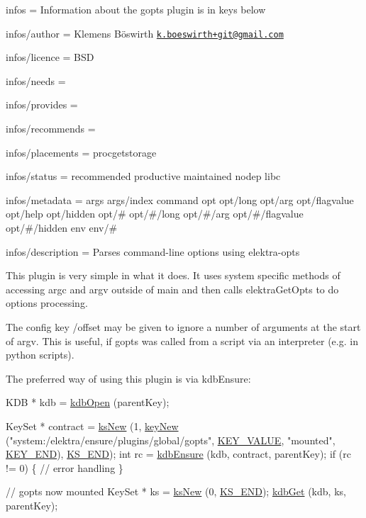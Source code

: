 
\begin{DoxyItemize}
\item infos = Information about the gopts plugin is in keys below
\item infos/author = Klemens Böswirth \href{mailto:k.boeswirth+git@gmail.com}{\tt k.\+boeswirth+git@gmail.\+com}
\item infos/licence = B\+SD
\item infos/needs =
\item infos/provides =
\item infos/recommends =
\item infos/placements = procgetstorage
\item infos/status = recommended productive maintained nodep libc
\item infos/metadata = args args/index command opt opt/long opt/arg opt/flagvalue opt/help opt/hidden opt/\# opt/\#/long opt/\#/arg opt/\#/flagvalue opt/\#/hidden env env/\#
\item infos/description = Parses command-\/line options using elektra-\/opts
\end{DoxyItemize}

This plugin is very simple in what it does. It uses system specific methods of accessing {\ttfamily argc} and {\ttfamily argv} outside of {\ttfamily main} and then calls {\ttfamily elektra\+Get\+Opts} to do options processing.

The config key {\ttfamily /offset} may be given to ignore a number of arguments at the start of {\ttfamily argv}. This is useful, if {\ttfamily gopts} was called from a script via an interpreter (e.\+g. in python scripts).

The preferred way of using this plugin is via {\ttfamily kdb\+Ensure}\+:


\begin{DoxyCode}
KDB * kdb = \hyperlink{group__kdb_ga6808defe5870f328dd17910aacbdc6ca}{kdbOpen} (parentKey);

KeySet * contract = \hyperlink{group__keyset_ga671e1aaee3ae9dc13b4834a4ddbd2c3c}{ksNew} (1, \hyperlink{group__key_gad23c65b44bf48d773759e1f9a4d43b89}{keyNew} (\textcolor{stringliteral}{"system:/elektra/ensure/plugins/global/gopts"}, 
      \hyperlink{group__key_gga9b703ca49f48b482def322b77d3e6bc8ac66e4a49d09212b79f5754ca6db5bd2e}{KEY\_VALUE}, \textcolor{stringliteral}{"mounted"}, \hyperlink{group__key_gga9b703ca49f48b482def322b77d3e6bc8aa8adb6fcb92dec58fb19410eacfdd403}{KEY\_END}), \hyperlink{group__keyset_ga7a28fce3773b2c873c94ac80b8b4cd54}{KS\_END});
\textcolor{keywordtype}{int} rc = \hyperlink{group__kdb_ga0955373877575fa21275891518f8ab31}{kdbEnsure} (kdb, contract, parentKey);
\textcolor{keywordflow}{if} (rc != 0)
\{
        \textcolor{comment}{// error handling}
\}

\textcolor{comment}{// gopts now mounted}
KeySet * ks = \hyperlink{group__keyset_ga671e1aaee3ae9dc13b4834a4ddbd2c3c}{ksNew} (0, \hyperlink{group__keyset_ga7a28fce3773b2c873c94ac80b8b4cd54}{KS\_END});
\hyperlink{group__kdb_ga28e385fd9cb7ccfe0b2f1ed2f62453a1}{kdbGet} (kdb, ks, parentKey);
\end{DoxyCode}


